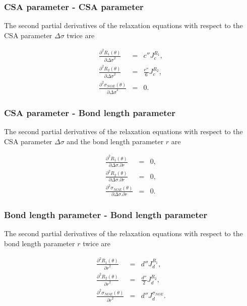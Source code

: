 \subsubsection{CSA parameter - CSA parameter}

The second partial derivatives of the relaxation equations with respect to the CSA parameter $\Delta\sigma$ twice are

\begin{eqnarray}
    \frac{\partial^2 R_1(\theta)}{{\partial \Delta\sigma}^2} & = & c'' J_c^{R_1},           \label{eq: Ri': d2R1/dCSA2} \\
    \frac{\partial^2 R_2(\theta)}{{\partial \Delta\sigma}^2} & = & \frac{c''}{6} J_c^{R_2}, \label{eq: Ri': d2R2/dCSA2} \\
    \frac{\partial^2 \sigma_{NOE}(\theta)}{{\partial \Delta\sigma}^2} & = & 0.              \label{eq: Ri': d2sigmaNOE/dCSA2}
\end{eqnarray}


\subsubsection{CSA parameter - Bond length parameter}

The second partial derivatives of the relaxation equations with respect to the CSA parameter $\Delta\sigma$ and the bond length parameter $r$ are

\begin{eqnarray}
    \frac{\partial^2 R_1(\theta)}{\partial \Delta\sigma . \partial r} & = & 0,          \label{eq: Ri': d2R1/dCSA.dr} \\
    \frac{\partial^2 R_2(\theta)}{\partial \Delta\sigma . \partial r} & = & 0,          \label{eq: Ri': d2R2/dCSA.dr} \\
    \frac{\partial^2 \sigma_{NOE}(\theta)}{\partial \Delta\sigma . \partial r} & = & 0. \label{eq: Ri': d2sigmaNOE/dCSA.dr}
\end{eqnarray}


\subsubsection{Bond length parameter - Bond length parameter}

The second partial derivatives of the relaxation equations with respect to the bond length parameter $r$ twice are

\begin{eqnarray}
    \frac{\partial^2 R_1(\theta)}{{\partial r}^2} & = & d'' J_d^{R_1},                    \label{eq: Ri': d2R1/dr2} \\
    \frac{\partial^2 R_2(\theta)}{{\partial r}^2} & = & \frac{d''}{2} J_d^{R_2},          \label{eq: Ri': d2R2/dr2} \\
    \frac{\partial^2 \sigma_{NOE}(\theta)}{{\partial r}^2} & = & d'' J_d^{\sigma_{NOE}}.  \label{eq: Ri': d2sigmaNOE/dr2}
\end{eqnarray}




